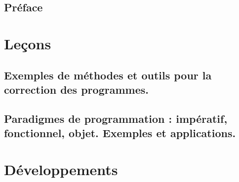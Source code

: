 






\tableofcontents

\chapter*{Préface}
%

\part{Leçons}

\chapter{Exemples de méthodes et outils pour la correction des programmes.} \label{L1}


\chapter{Paradigmes de programmation : impératif, fonctionnel, objet. Exemples et applications.} \label{L2}



\makeatletter
\renewcommand{\@chapapp}{Développement}
\setcounter{chapter}{0}
\makeatother
\renewcommand\theHchapter{sec.\thechapter} %

\part{Développements}
 


